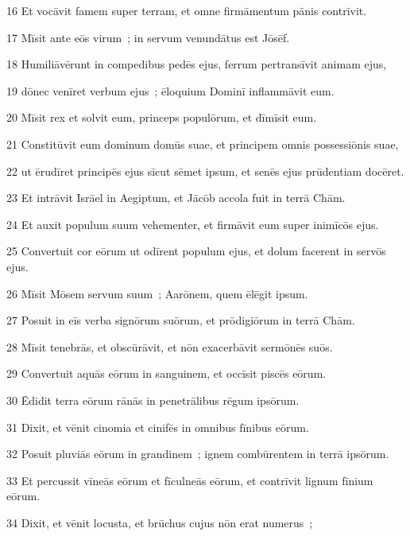 \psalmVerse
  {\phantom{0}16}
  {Et vocāvit famem super terram, et omne firmāmentum pānis contrīvit.}


\psalmVerse
  {\phantom{0}17}
  {Mīsit ante eōs virum~; in servum venundātus est Jōsēf.}


\psalmVerse
  {\phantom{0}18}
  {Humiliāvērunt in compedibus pedēs ejus, ferrum pertransīvit animam ejus,}


\psalmVerse
  {\phantom{0}19}
  {dōnec venīret verbum ejus~; ēloquium Dominī inflammāvit eum.}


\psalmVerse
  {\phantom{0}20}
  {Mīsit rex et solvit eum, princeps populōrum, et dīmīsit eum.}


\psalmVerse
  {\phantom{0}21}
  {Constitūvit eum dominum domūs suae, et principem omnis possessiōnis suae,}


\psalmVerse
  {\phantom{0}22}
  {ut ērudīret principēs ejus sīcut sēmet ipsum, et senēs ejus prūdentiam docēret.}


\psalmVerse
  {\phantom{0}23}
  {Et intrāvit Isrāel in Aegiptum, et Jācōb accola fuit in terrā Chām.}


\psalmVerse
  {\phantom{0}24}
  {Et auxit populum suum vehementer, et firmāvit eum super inimīcōs ejus.}


\psalmVerse
  {\phantom{0}25}
  {Convertuit cor eōrum ut odīrent populum ejus, et dolum facerent in servōs ejus.}


\psalmVerse
  {\phantom{0}26}
  {Mīsit Mōsem servum suum~; Aarōnem, quem ēlēgit ipsum.}


\psalmVerse
  {\phantom{0}27}
  {Posuit in eīs verba signōrum suōrum, et prōdigiōrum in terrā Chām.}


\psalmVerse
  {\phantom{0}28}
  {Mīsit tenebrās, et obscūrāvit, et nōn exacerbāvit sermōnēs suōs.}


\psalmVerse
  {\phantom{0}29}
  {Convertuit aquās eōrum in sanguinem, et occīsit piscēs eōrum.}


\psalmVerse
  {\phantom{0}30}
  {Ēdidit terra eōrum rānās in  penetrālibus rēgum ipsōrum.}


\psalmVerse
  {\phantom{0}31}
  {Dixit, et vēnit cinomia et cinifēs in omnibus fīnibus eōrum.}


\psalmVerse
  {\phantom{0}32}
  {Posuit pluviās eōrum in grandinem~; ignem combūrentem in terrā ipsōrum.}


\psalmVerse
  {\phantom{0}33}
  {Et percussit vīneās eōrum et fīculneās eōrum, et contrīvit lignum fīnium eōrum.}


\psalmVerse
  {\phantom{0}34}
  {Dixit, et vēnit locusta, et brūchus cujus nōn erat numerus~;}


